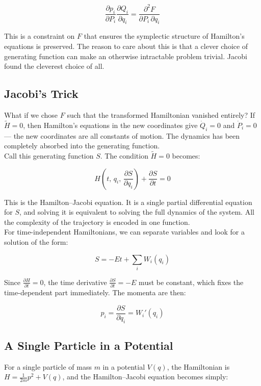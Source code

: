 \documentclass[krantz1,ChapterTOCs]{krantz}
\begin{document}
\[
\frac{\partial p_i}{\partial P_i}\frac{\partial Q_i}{\partial q_i} 
= \frac{\partial^2 F}{\partial P_i\,\partial q_i}
\]

This is a constraint on $F$ that ensures the symplectic structure of 
Hamilton's equations is preserved. The reason to care about this is 
that a clever choice of generating function can make an otherwise 
intractable problem trivial. Jacobi found the cleverest choice of all.\\

\subsection*{Jacobi's Trick}

What if we chose $F$ such that the transformed Hamiltonian vanished 
entirely? If $\tilde{H} = 0$, then Hamilton's equations in the new 
coordinates give $\dot{Q}_i = 0$ and $\dot{P}_i = 0$ --- the new 
coordinates are all constants of motion. The dynamics has been 
completely absorbed into the generating function.\\

Call this generating function $S$. The condition $\tilde{H} = 0$ 
becomes:

\[
\boxed{H\!\left(t,\, q_i,\, \frac{\partial S}{\partial q_i}\right) 
+ \frac{\partial S}{\partial t} = 0}
\]

This is the Hamilton--Jacobi equation. It is a single partial 
differential equation for $S$, and solving it is equivalent to solving 
the full dynamics of the system. All the complexity of the trajectory 
is encoded in one function.\\

For time-independent Hamiltonians, we can separate variables and look 
for a solution of the form:

\[
S = -Et + \sum_i W_i(q_i)
\]

Since $\frac{\partial H}{\partial t} = 0$, the time derivative 
$\frac{\partial S}{\partial t} = -E$ must be constant, which fixes 
the time-dependent part immediately. The momenta are then:

\[
p_i = \frac{\partial S}{\partial q_i} = W_i'(q_i)
\]

\subsection*{A Single Particle in a Potential}

For a single particle of mass $m$ in a potential $V(q)$, the 
Hamiltonian is $H = \frac{1}{2m}p^2 + V(q)$, and the 
Hamilton--Jacobi equation becomes simply:
\end{document}

